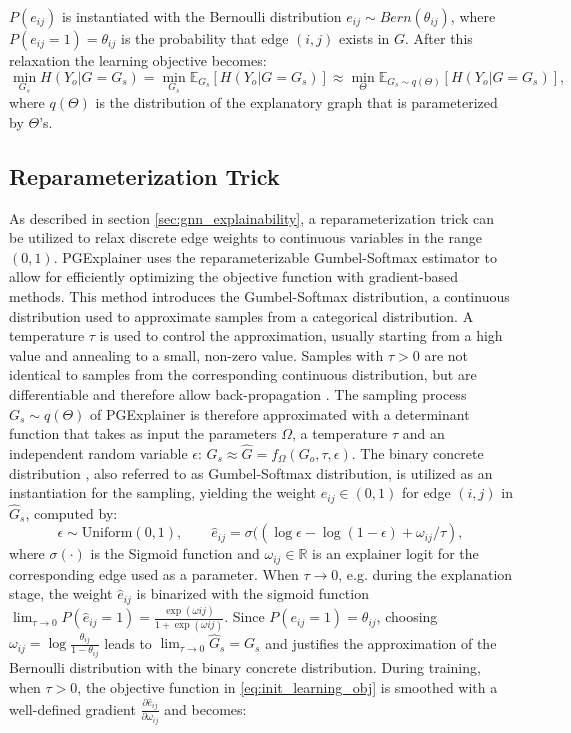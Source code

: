  $P(e_{ij})$ is instantiated with the Bernoulli distribution $e_{ij} \sim Bern(\theta_{ij})$, where $P(e_{ij} = 1) = \theta_{ij}$ is the probability that edge $(i,j)$ exists in $G$.
After this relaxation the learning objective becomes:
\begin{equation}
    \label{eq:init_learning_obj}
    \min_{G_s}H(Y_o|G = G_s) = \min_{G_s} \mathbb{E}_{G_s}[H(Y_o|G = G_s)] \approx \min_{\Theta} \mathbb{E}_{G_s \sim q(\Theta)}[H(Y_o|G = G_s)],
\end{equation}
where $q(\Theta)$ is the distribution of the explanatory graph that is parameterized by $\Theta$'s.

\subsection{Reparameterization Trick}
\label{sec:Reparameterization_Trick}
As described in section \ref{sec:gnn_explainability}, a reparameterization trick can be utilized to relax discrete edge weights to continuous variables in the range $(0,1)$. PGExplainer uses the reparameterizable Gumbel-Softmax estimator \cite{jang2016categorical} to allow for efficiently optimizing the objective function with gradient-based methods. This method introduces the Gumbel-Softmax distribution, a continuous distribution used to approximate samples from a categorical distribution. A temperature $\tau$ is used to control the approximation, usually starting from a high value and annealing to a small, non-zero value. Samples with $\tau > 0$ are not identical to samples from the corresponding continuous distribution, but are differentiable and therefore allow back-propagation \cite{abid2019concrete}. The sampling process $G_s \sim q(\Theta)$ of PGExplainer is therefore approximated with a determinant function that takes as input the parameters $\Omega$, a temperature $\tau$ and an independent random variable $\epsilon$: $G_s \approx \hat{G}=f_\Omega(G_o,\tau,\epsilon)$. The binary concrete distribution \cite{maddison2016concrete}, also referred to as Gumbel-Softmax distribution, is utilized as an instantiation for the sampling, yielding the weight $\hat{e}_{ij} \in (0,1)$ for edge $(i,j)$ in $\hat{G}_s$, computed by:
\begin{equation}
    \label{eq:reparam_trick}
    \epsilon \sim \text{Uniform}(0,1), \qquad \hat{e}_{ij}=\sigma((\log \epsilon - \log(1-\epsilon)+\omega_{ij}/\tau),
\end{equation}
where $\sigma(\cdot)$ is the Sigmoid function and $\omega_{ij} \in \mathbb{R}$ is an explainer logit for the corresponding edge used as a parameter. When $\tau \rightarrow 0$, e.g. during the explanation stage, the weight $\hat{e}_{ij}$ is binarized with the sigmoid function $\lim_{\tau\rightarrow 0}P(\hat{e}_{ij} = 1) = \frac{\exp (\omega{ij})}{1+\exp (\omega{ij})}$. Since $P(e_{ij} = 1) = \theta_{ij}$, choosing $\omega_{ij} = \log\frac{\theta_{ij}}{1-\theta_{ij}}$ leads to $\lim_{\tau\rightarrow 0}\hat{G}_s = G_s$ and justifies the approximation of the Bernoulli distribution with the binary concrete distribution. During training, when $\tau > 0$, the objective function in \eqref{eq:init_learning_obj} is smoothed with a well-defined gradient $\frac{\partial\hat{e}_{ij}}{\partial\omega_{ij}}$ and becomes:
